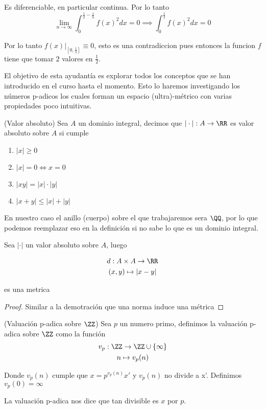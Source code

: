 \documentclass[a4paper,oneside,10.5pt]{USMArt}
\begin{document}
Es diferenciable, en particular continua. Por lo tanto
\begin{equation*}
  \lim_{n \to \infty} \int_{0}^{\frac{1}{2} - \frac{1}{n}} f(x)^{2} dx = 0 \implies \int_{0}^{\frac{1}{2}} f(x)^{2} dx = 0
\end{equation*}

Por lo tanto $f(x)|_{[0, \frac{1}{2}]} \equiv 0$, esto es una contradiccion pues entonces la funcion $f$ tiene que tomar
$2$ valores en $\frac{1}{2}$.

\newpage

El objetivo de esta ayudantía es explorar todos los conceptos que se han introducido en el curso hasta el
momento. Esto lo haremos investigando los números p-adicos los cuales forman un espacio (ultra)-métrico
con varias propiedades poco intuitivas.

\begin{defi}{(Valor absoluto)}
  Sea $A$ un dominio integral, decimos que $|\cdot| : A \to \RR$ es valor absoluto sobre $A$ si cumple
  \begin{enumerate}
    \item $|x| \geq 0$
    \item $|x| = 0 \iff x = 0$
    \item $|xy| = |x| \cdot |y|$
    \item $|x + y| \leq |x| + |y|$
  \end{enumerate}
\end{defi}

\begin{obs}
  En nuestro caso el anillo (cuerpo) sobre el que trabajaremos sera $\QQ$, por lo que podemos reemplazar eso en la
  definición si no sabe lo que es un dominio integral.
\end{obs}

\begin{teo}
  Sea $|\cdot|$ un valor absoluto sobre $A$, luego

  \begin{gather*}
    d : A \times A \to \RR\\
    (x, y) \mapsto |x - y|
  \end{gather*}

  es una metrica
\end{teo}
\begin{proof}
  Similar a la demotraci\'on que una norma induce una métrica
\end{proof}

\begin{defi}{(Valuación p-adica sobre $\ZZ$)}
  Sea $p$ un numero primo, definimos la valuación p-adica sobre $\ZZ$ como la funci\'on
  \begin{gather*}
    v_{p} : \ZZ \to \ZZ \cup \{\infty\}\\
    n \mapsto v_{p}(n)
  \end{gather*}

  Donde $v_{p}(n)$ cumple que $x = p^{v_{p}(n)}x' $ y $v_{p}(n)$ no divide a x'. Definimos $v_{p}(0) = \infty$
\end{defi}
\begin{obs}
  La valuaci\'on p-adica nos dice que tan divisible es $x$ por $p$.
\end{obs}
\end{document}
